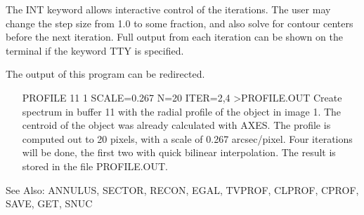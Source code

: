 The INT keyword allows interactive control of the iterations.  The user may
change the step size from 1.0 to some fraction, and also solve for contour
centers before the next iteration. Full output from each iteration can be
shown on the terminal if the keyword TTY is specified.

The output of this program can be redirected.

\begin{itemize}
  \item[PROFILE 11 1 SCALE=0.267 N=20 ITER=2,4 >PROFILE.OUT\hfill]{Create
       spectrum in buffer 11 with the radial profile of the object in image
       1.  The centroid of the object was already calculated with AXES.
       The profile is computed out to 20 pixels, with a scale of 0.267
       arcsec/pixel.  Four iterations will be done, the first two with
       quick bilinear interpolation.  The result is stored in the file
       PROFILE.OUT.}
\end{itemize}

See Also: ANNULUS, SECTOR, RECON, EGAL, TVPROF, CLPROF, CPROF, 
          SAVE, GET, SNUC


